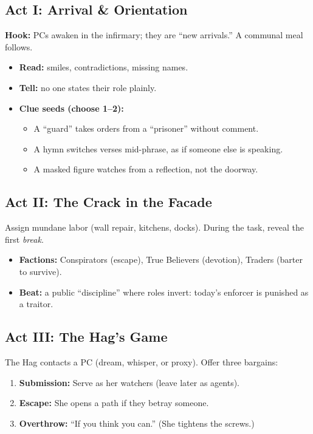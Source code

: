 \documentclass[11pt]{article}
\begin{document}
\subsection{Act I: Arrival \& Orientation}
\textbf{Hook:} PCs awaken in the infirmary; they are ``new arrivals.'' A communal meal follows.
\begin{itemize}
  \item \textbf{Read:} smiles, contradictions, missing names. 
  \item \textbf{Tell:} no one states their role plainly.
  \item \textbf{Clue seeds (choose 1--2):}
  \begin{itemize}
    \item A ``guard'' takes orders from a ``prisoner'' without comment.
    \item A hymn switches verses mid-phrase, as if someone else is speaking.
    \item A masked figure watches from a reflection, not the doorway.
  \end{itemize}
\end{itemize}

\subsection{Act II: The Crack in the Facade}
Assign mundane labor (wall repair, kitchens, docks). During the task, reveal the first \emph{break}.
\begin{itemize}
  \item \textbf{Factions:} Conspirators (escape), True Believers (devotion), Traders (barter to survive).
  \item \textbf{Beat:} a public ``discipline'' where roles invert: today's enforcer is punished as a traitor.
\end{itemize}

\subsection{Act III: The Hag's Game}
The Hag contacts a PC (dream, whisper, or proxy). Offer three bargains:
\begin{enumerate}
  \item \textbf{Submission:} Serve as her watchers (leave later as agents).
  \item \textbf{Escape:} She opens a path if they betray someone.
  \item \textbf{Overthrow:} ``If you think you can.'' (She tightens the screws.)
\end{enumerate}
\end{document}

